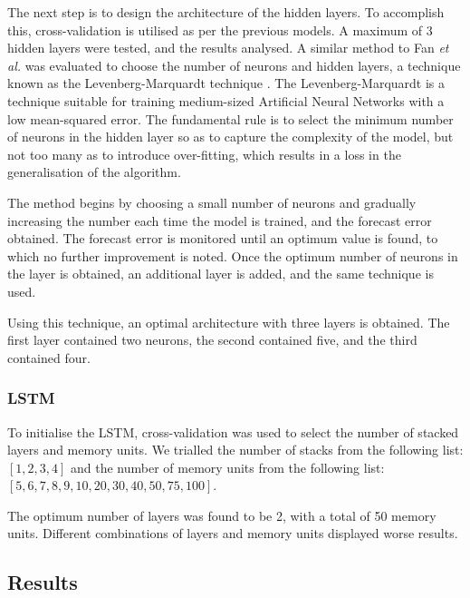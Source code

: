 The next step is to design the architecture of the hidden layers. To accomplish this, cross-validation is utilised as per the previous models. A maximum of 3 hidden layers were tested, and the results analysed. A similar method to Fan \textit{et al.}  \cite{Fan2009} was evaluated to choose the number of neurons and hidden layers, a technique known as the Levenberg-Marquardt technique \cite{more1978levenberg}. The Levenberg-Marquardt is a technique suitable for training medium-sized Artificial Neural Networks with a low mean-squared error. The fundamental rule is to select the minimum number of neurons in the hidden layer so as to capture the complexity of the model, but not too many as to introduce over-fitting, which results in a loss in the generalisation of the algorithm.

The method begins by choosing a small number of neurons and gradually increasing the number each time the model is trained, and the forecast error obtained. The forecast error is monitored until an optimum value is found, to which no further improvement is noted. Once the optimum number of neurons in the layer is obtained, an additional layer is added, and the same technique is used.

Using this technique, an optimal architecture with three layers is obtained. The first layer contained two neurons, the second contained five, and the third contained four.



\subsubsection{LSTM}

To initialise the LSTM, cross-validation was used to select the number of stacked layers and memory units. We trialled the number of stacks from the following list: $[1,2,3,4]$ and the number of memory units from the following list: $[5,6,7,8,9,10,20,30,40,50,75,100]$.

The optimum number of layers was found to be 2, with a total of 50 memory units. Different combinations of layers and memory units displayed worse results.



\subsection{Results}


